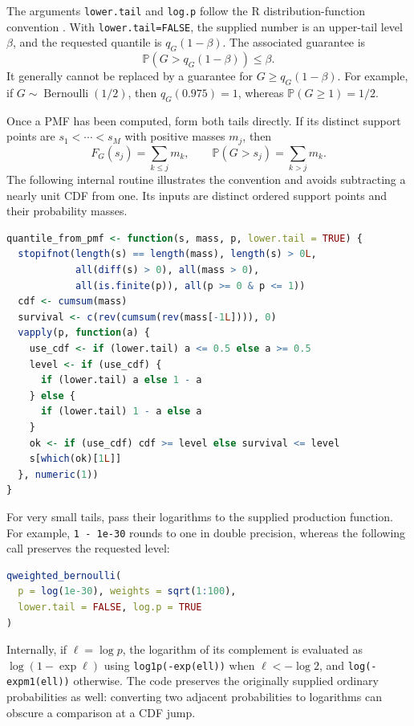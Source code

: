 \documentclass[11pt,letterpaper]{article}
\numberwithin{equation}{section}
\theoremstyle{definition}
\theoremstyle{remark}
\begin{document}
The arguments \texttt{lower.tail} and \texttt{log.p} follow the R
distribution-function convention \cite{rbinomial,rsignrank}.  With
\texttt{lower.tail=FALSE}, the supplied number is an upper-tail level
$\beta$, and the requested quantile is $q_G(1-\beta)$.  The associated
guarantee is
\begin{equation}
 \mathbb P(G>q_G(1-\beta))\le\beta.
 \label{eq:strict-quantile-tail}
\end{equation}
It generally cannot be replaced by a guarantee for $G\ge q_G(1-\beta)$.
For example, if $G\sim\operatorname{Bernoulli}(1/2)$, then
$q_G(0.975)=1$, whereas $\mathbb P(G\ge1)=1/2$.

Once a PMF has been computed, form both tails directly.  If its distinct
support points are $s_1<\cdots<s_M$ with positive masses $m_j$, then
\[
 F_G(s_j)=\sum_{k\le j}m_k,
 \qquad \mathbb P(G>s_j)=\sum_{k>j}m_k.
\]
The following internal routine illustrates the convention and avoids
subtracting a nearly unit CDF from one.  Its inputs are distinct ordered
support points and their probability masses.

\begin{lstlisting}[language=R]
quantile_from_pmf <- function(s, mass, p, lower.tail = TRUE) {
  stopifnot(length(s) == length(mass), length(s) > 0L,
            all(diff(s) > 0), all(mass > 0),
            all(is.finite(p)), all(p >= 0 & p <= 1))
  cdf <- cumsum(mass)
  survival <- c(rev(cumsum(rev(mass[-1L]))), 0)
  vapply(p, function(a) {
    use_cdf <- if (lower.tail) a <= 0.5 else a >= 0.5
    level <- if (use_cdf) {
      if (lower.tail) a else 1 - a
    } else {
      if (lower.tail) 1 - a else a
    }
    ok <- if (use_cdf) cdf >= level else survival <= level
    s[which(ok)[1L]]
  }, numeric(1))
}
\end{lstlisting}

For very small tails, pass their logarithms to the supplied production
function.  For example, \texttt{1 - 1e-30} rounds to one in double
precision, whereas the following call preserves the requested level:
\begin{lstlisting}[language=R]
qweighted_bernoulli(
  p = log(1e-30), weights = sqrt(1:100),
  lower.tail = FALSE, log.p = TRUE
)
\end{lstlisting}
Internally, if $\ell=\log p$, the logarithm of its complement is evaluated
as $\log(1-\exp\ell)$ using \texttt{log1p(-exp(ell))} when
$\ell<-\log2$, and \texttt{log(-expm1(ell))} otherwise.  The code preserves
the originally supplied ordinary probabilities as well: converting two
adjacent probabilities to logarithms can obscure a comparison at a CDF
jump.
\end{document}
